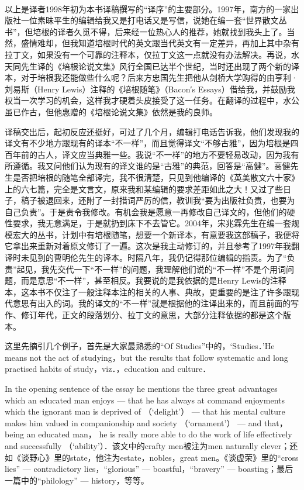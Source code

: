 \par  
\par 以上是译者1998年初为本书译稿撰写的“译序”的主要部分。1997年，南方的一家出版社一位素昧平生的编辑给我又是打电话又是写信，说她在编一套“世界散文丛书”，但培根的译者久觅不得，后来经一位热心人的推荐，她就找到我头上了。当然，盛情难却，但我知道培根时代的英文跟当代英文有一定差异，再加上其中杂有拉丁文，如果没有一个可靠的注释本，仅拉丁文这一点就没有办法解决。再说，水天同先生译的《培根论说文集》风行全国已达半个世纪，当时还出现了两个新的译本，对于培根我还能做些什么呢？后来方忠国先生把他从剑桥大学购得的由亨利·刘易斯（Henry Lewis）注释的《培根随笔》（Bacon′s Essays）借给我，并鼓励我权当一次学习的机会，这样我才硬着头皮接受了这一任务。在翻译的过程中，水公虽已作古，但他惠赠的《培根论说文集》依然是我的良师。
\par 译稿交出后，起初反应还挺好，可过了几个月，编辑打电话告诉我，他们发现我的译文有不少地方跟现有的译本“不一样”，而且觉得译文“不够古雅”，因为培根是四百年前的古人，译文应当典雅一些。我说“不一样”的地方不要轻易改动，因为我有所遵循。我又问他们认为现有的译文谁的是“古雅”的典范，回答是“高健”。高健先生是否把培根的随笔全部译完，我不很清楚，只见到他编译的《英美散文六十家》上的六七篇，完全是文言文，原来我和某编辑的要求差距如此之大！又过了些日子，稿子被退回来，还附了一封措词严厉的信，教训我“要为出版社负责，也要为自己负责”。于是责令我修改。有机会我是愿意一再修改自己译文的，但他们的硬性要求，我无意满足，于是就扔到床下不去管它。2004年，宋兆霖先生在编一套规模宏大的丛书，计划中有培根随笔，想要一个新译本，有意要我这部稿子，我便将它拿出来重新对着原文修订了一遍。这次是我主动修订的，并且参考了1997年我翻译时未见到的曹明伦先生的译本。时隔八年，我仍记得那位编辑的指责。为了“负责”起见，我先交代一下“不一样”的问题，我理解他们说的“不一样”不是个用词问题，而是意思“不一样”，甚至相反。我要说的是我依据的是Henry Lewis的注释本，这本书不仅注了一般注释本注的相关的人事、典故，更重要的是注了许多跟现代意思有出入的词。我的译文的“不一样”就是根据他的注译出来的，而且前面的写作、修订年代，正文的段落划分、拉丁文的意思，大部分注释依据的都是这个版本。
\par 这里先摘引几个例子，首先是大家最熟悉的“Of Studies”中的，‘Studies．’He means not the act of studying，but the results that follow systematic and long practised habits of study，viz．，education and culture．
\par In the opening sentence of the essay he mentions the three great advantages which an educated man enjoys — that he has always at command enjoyments which the ignorant man is deprived of （‘delight’） — that his mental culture makes him valued in companionship and society （‘ornament’） — and that，being an educated man， he is really more able to do the work of life effectively and successfully （‘ability’）．该文中的crafty men被注为men naturally clever；还如《谈野心》里的state，他注为estate，nobles，great men。《谈虚荣》里的“cross lies” — contradictory lies，“glorious” — boastful，“bravery” — boasting；最后一篇中的“philology” — history，等等。
